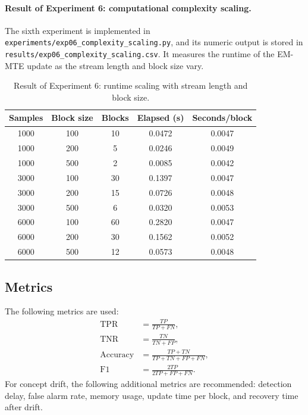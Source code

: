 ﻿\documentclass[12pt,a4paper]{article}
\begin{document}
\paragraph{Result of Experiment 6: computational complexity scaling.}
The sixth experiment is implemented in
\texttt{experiments/exp06\_complexity\_scaling.py}, and its numeric output is
stored in \texttt{results/exp06\_complexity\_scaling.csv}. It measures the
runtime of the EM-MTE update as the stream length and block size vary.

\begin{table}[H]
\centering
\caption{Result of Experiment 6: runtime scaling with stream length and block size.}
\label{tab:exp06_complexity_result}
\renewcommand{\arraystretch}{1.15}
\begin{tabular}{ccccc}
\toprule
\textbf{Samples} & \textbf{Block size} & \textbf{Blocks} & \textbf{Elapsed (s)} & \textbf{Seconds/block}\\
\midrule
1000 & 100 & 10 & 0.0472 & 0.0047\\
1000 & 200 & 5 & 0.0246 & 0.0049\\
1000 & 500 & 2 & 0.0085 & 0.0042\\
3000 & 100 & 30 & 0.1397 & 0.0047\\
3000 & 200 & 15 & 0.0726 & 0.0048\\
3000 & 500 & 6 & 0.0320 & 0.0053\\
6000 & 100 & 60 & 0.2820 & 0.0047\\
6000 & 200 & 30 & 0.1562 & 0.0052\\
6000 & 500 & 12 & 0.0573 & 0.0048\\
\bottomrule
\end{tabular}
\end{table}

\subsection{Metrics}
The following metrics are used:
\begin{align}
\mathrm{TPR} &= \frac{TP}{TP+FN},\\
\mathrm{TNR} &= \frac{TN}{TN+FP},\\
\mathrm{Accuracy} &= \frac{TP+TN}{TP+TN+FP+FN},\\
\mathrm{F1} &= \frac{2TP}{2TP+FP+FN}.
\end{align}
For concept drift, the following additional metrics are recommended: detection delay, false alarm rate, memory usage, update time per block, and recovery time after drift.
\end{document}
